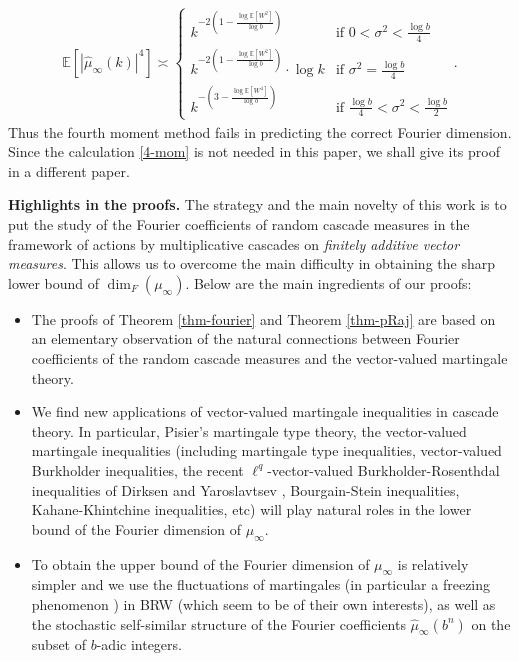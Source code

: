 \documentclass[12pt]{amsart}
\theoremstyle{definition}
\theoremstyle{remark}
\newcommand{\E}{\mathbb{E}}
\numberwithin{equation}{section}
\begin{document}
\begin{itemize}
\begin{align}\label{4-mom}
\E[|\widehat{\mu}_\infty(k)|^4] \asymp    \left\{  \begin{array}{ll}    
k^{- 2 ( 1 -  \frac{\log \E[W^2]}{\log b})} & \text{if $0<\sigma^2< \frac{ \log b}{4}$}
\\
 k^{- 2 ( 1 -  \frac{\log \E[W^2]}{\log b})}  \cdot  \log k   & \text{if $\sigma^2 =\frac{\log b}{4}$}
\\
 k^{- (3 - \frac{\log \E[W^4]}{\log b})}  &   \text{if $\frac{\log b}{4}<\sigma^2< \frac{ \log b}{2}$}
\end{array}
\right. . 
\end{align}
Thus the fourth moment method fails in  predicting the correct Fourier dimension.  Since the calculation \eqref{4-mom} is not needed in this paper,  we shall give its proof in a different paper. 
	\end{itemize}	
	
  





{\flushleft \bf  Highlights in the proofs.} 
The strategy and the main novelty of this work is  to put the study of the Fourier coefficients of  random cascade measures in the framework of actions by  multiplicative cascades on {\it finitely additive vector measures}. This allows us to overcome the main difficulty in obtaining the sharp lower bound of  $\dim_F(\mu_\infty)$.        Below are the main ingredients of our proofs:
\begin{itemize}
	\item 
	The proofs of Theorem \ref{thm-fourier} and Theorem \ref{thm-pRaj}   are  based on an elementary observation of the natural connections between Fourier coefficients of the  random cascade measures and the vector-valued martingale theory.   

	\item We find new applications of vector-valued martingale inequalities in cascade theory.  In particular, Pisier's martingale type theory,  the vector-valued martingale inequalities (including martingale type inequalities,  vector-valued Burkholder inequalities, the recent $\ell^q$-vector-valued Burkholder-Rosenthdal inequalities of Dirksen and Yaroslavtsev \cite{PLMS-2019}, Bourgain-Stein inequalities, Kahane-Khintchine inequalities, etc)  will play natural roles in the lower bound of the Fourier dimension of $\mu_\infty$. 
	
	\item To obtain the upper bound of the Fourier dimension of $\mu_\infty$ is relatively simpler and we use the  fluctuations of martingales (in particular a freezing phenomenon \cite{D-S}) in BRW (which seem to be  of their own interests), as well as the stochastic self-similar structure of the Fourier coefficients   $\widehat{\mu}_\infty(b^n)$ on the subset of $b$-adic integers.     
\end{itemize}
\end{document}
